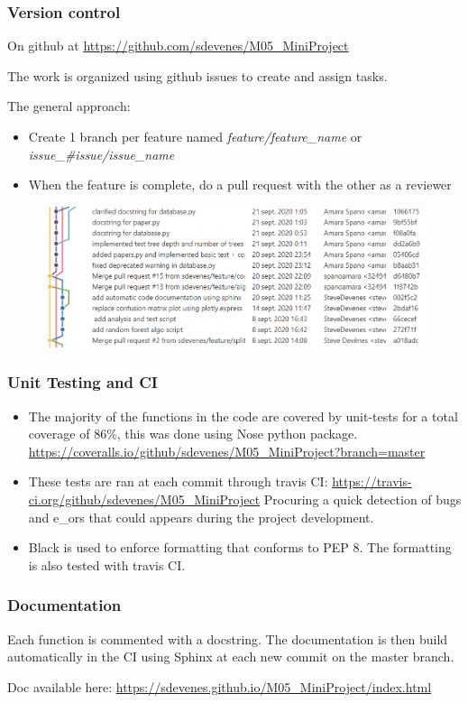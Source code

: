 \documentclass{beamer}
\begin{document}
	\begin{frame}
		\frametitle{Version control}
		On github at \url{https://github.com/sdevenes/M05_MiniProject}

		The work is organized using github issues to create and assign tasks.

		The general approach:
		\begin{itemize}
			\item Create 1 branch per feature named \textit{feature/feature\_name} or \textit{issue\_\#issue/issue\_name} 
			\item When the feature is complete, do a pull request with the other as a reviewer
		\end{itemize}

		\begin{figure}
			\centering
			\includegraphics[width=\linewidth]{img/git_tree.png}
		\end{figure}
	\end{frame}


	\begin{frame}
		\frametitle{Unit Testing and CI}
		\begin{itemize}
			
			\item The majority of the functions in the code are covered by unit-tests for a total coverage of 86\%,
			this was done using Nose python package.
			\url{https://coveralls.io/github/sdevenes/M05_MiniProject?branch=master}
			\item These tests are ran at each commit through travis CI:
			\url{https://travis-ci.org/github/sdevenes/M05_MiniProject}
			Procuring a quick detection of bugs and e\_ors that could appears
			during the project development.
			\item Black is used to enforce formatting that conforms to PEP 8. The formatting is also tested with travis CI.
		\end{itemize}
	\end{frame}

	\begin{frame}
		\frametitle{Documentation}
		Each function is commented with a docstring. The documentation is
		then build automatically in the CI using Sphinx at each new commit on the
		master branch.

		Doc available here: \url{https://sdevenes.github.io/M05_MiniProject/index.html}
	\end{frame}
\end{document}
